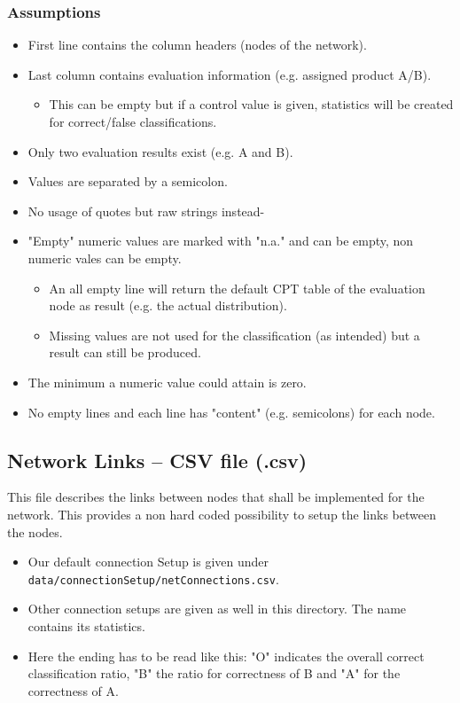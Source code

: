 \documentclass[12pt]{scrartcl}
\begin{document}
\subsubsection{Assumptions}
\begin{itemize}
    \item First line contains the column headers (nodes of the network).
    \item Last column contains evaluation information (e.g. assigned product A/B).
    \begin{itemize}
        \item This can be empty but if a control value is given, statistics will be created for correct/false classifications.
    \end{itemize}
    \item Only two evaluation results exist (e.g. A and B).
    \item Values are separated by a semicolon.
    \item No usage of quotes but raw strings instead-
    \item "Empty" numeric values are marked with "n.a." and can be empty, non numeric vales can be empty.
    \begin{itemize}
        \item An all empty line will return the default CPT table of the evaluation node as result (e.g. the actual distribution).
        \item Missing values are not used for the classification (as intended) but a result can still be produced.
    \end{itemize}
    \item The minimum a numeric value could attain is zero.
    \item No empty lines and each line has "content" (e.g. semicolons) for each node.
\end{itemize}

\subsection{Network Links -- CSV file (.csv)}
This file describes the links between nodes that shall be implemented for the network. This provides a non hard coded possibility to setup the links between the nodes.

\begin{itemize}
    \item Our default connection Setup is given under\\ \texttt{data/connectionSetup/netConnections.csv}.
    \item Other connection setups are given as well in this directory. The name contains its statistics.
    \item Here the ending has to be read like this: "O" indicates the overall correct classification ratio, "B" the ratio for correctness of B and "A" for the correctness of A.
\end{itemize}
\end{document}
